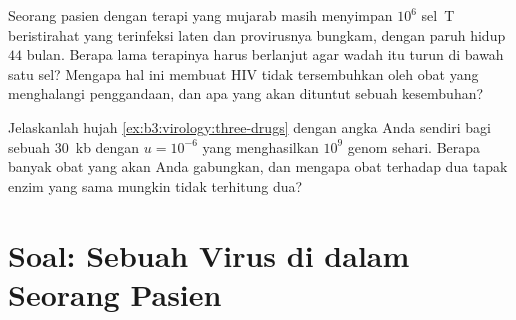 \begin{exercise}[$\star\star\star$]\label{exo:b3:virology:11}
Seorang pasien dengan terapi yang mujarab masih menyimpan $10^{6}$ sel~T
beristirahat yang terinfeksi laten dan provirusnya bungkam, dengan paruh hidup
$44$ bulan. Berapa lama terapinya harus berlanjut agar wadah itu turun di bawah
satu sel? Mengapa hal ini membuat HIV tidak tersembuhkan oleh obat yang
menghalangi penggandaan, dan apa yang akan dituntut sebuah kesembuhan?
\end{exercise}

\begin{exercise}[$\star\star\star$]\label{exo:b3:virology:12}
Jelaskanlah hujah \cref{ex:b3:virology:three-drugs} dengan angka Anda sendiri
bagi sebuah  \qty{30}{kb} dengan $u = 10^{-6}$ yang menghasilkan $10^{9}$
genom sehari. Berapa banyak obat yang akan Anda gabungkan, dan mengapa obat
terhadap dua tapak enzim yang sama mungkin tidak terhitung dua?
\end{exercise}

\section{Soal: Sebuah Virus di dalam Seorang Pasien}

